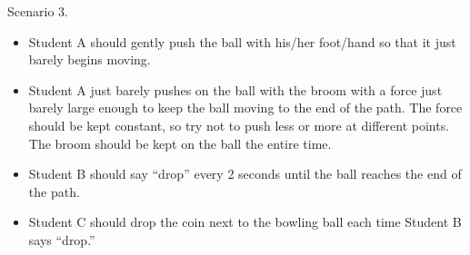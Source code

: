 \documentclass[]{exam}
\begin{document}
\begin{questions}

\question 
Scenario 3.

\begin{itemize}[itemsep=0pt,topsep=0pt]
    \item Student A should gently push the ball with his/her foot/hand so that it just barely begins moving.
    \item Student A just barely pushes on the ball with the broom with a force just barely large enough to keep the ball moving to the end of the path. The force should be kept constant, so try not to push less or more at different points.  The broom should be kept on the ball the entire time.
    \item Student B should say ``drop'' every 2 seconds until the ball reaches the end of the path.
    \item Student C should drop the coin next to the bowling ball each time Student B says ``drop.''
\end{itemize}

\medskip

\end{questions}
\end{document}
